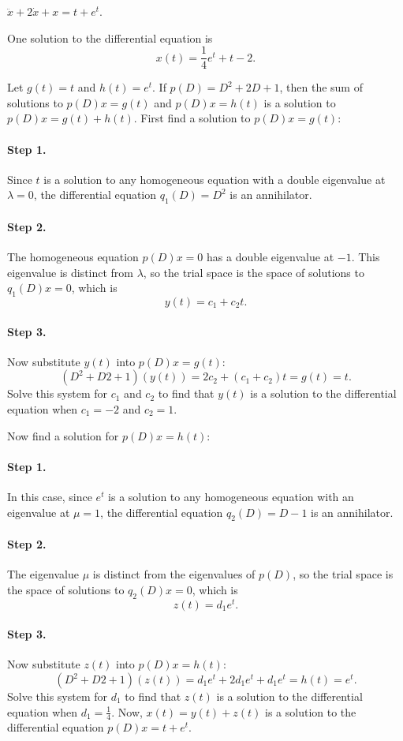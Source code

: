 \documentclass{ximera}
\begin{document}
\begin{exercise}  \label{c12.4.2}
$\ddot{x}+2\dot{x}+x = t + e^t$.

\begin{solution}
\ans One solution to the differential equation is
\[
x(t) = \frac{1}{4}e^t + t - 2.
\]

\soln Let $g(t) = t$ and $h(t) = e^t$.  If $p(D) = D^2 + 2D + 1$, then the
sum of solutions to $p(D)x = g(t)$ and $p(D)x = h(t)$ is a solution to
$p(D)x = g(t) + h(t)$.  First find a solution to $p(D)x = g(t)$:

\paragraph{Step 1.} Since $t$ is a solution to any homogeneous equation
with a double eigenvalue at $\lambda = 0$, the differential equation
$q_1(D) = D^2$ is an annihilator.

\paragraph{Step 2.} The homogeneous equation $p(D)x = 0$ has a double
eigenvalue at $-1$.  This eigenvalue is distinct from $\lambda$, so
the trial space is the space of solutions to $q_1(D)x = 0$, which is
\[
y(t) = c_1 + c_2t.
\]
\paragraph{Step 3.} Now substitute $y(t)$ into $p(D)x = g(t)$:
\[
(D^2 + D2 + 1)(y(t)) = 2c_2 + (c_1 + c_2)t = g(t) = t.
\]
Solve this system for $c_1$ and $c_2$ to find that $y(t)$ is a solution to
the differential equation when $c_1 = -2$ and $c_2 = 1$.

\para Now find a solution for $p(D)x = h(t)$:

\paragraph{Step 1.} In this case, since $e^t$ is a solution to any
homogeneous equation with an eigenvalue at $\mu = 1$, the differential
equation $q_2(D) = D - 1$ is an annihilator.

\paragraph{Step 2.} The eigenvalue $\mu$ is distinct from the eigenvalues
of $p(D)$, so the trial space is the space of solutions to $q_2(D)x =
0$, which is
\[
z(t) = d_1e^t.
\]
\paragraph{Step 3.} Now substitute $z(t)$ into $p(D)x = h(t)$:
\[
(D^2 + D2 + 1)(z(t)) = d_1e^t + 2d_1e^t + d_1e^t = h(t) = e^t.
\]
Solve this system for $d_1$ to find that $z(t)$ is a solution to
the differential equation when $d_1 = \frac{1}{4}$.  Now, $x(t) = y(t) + z(t)$
is a solution to the differential equation $p(D)x = t + e^t$.


\end{solution}
\end{exercise}
\end{document}
